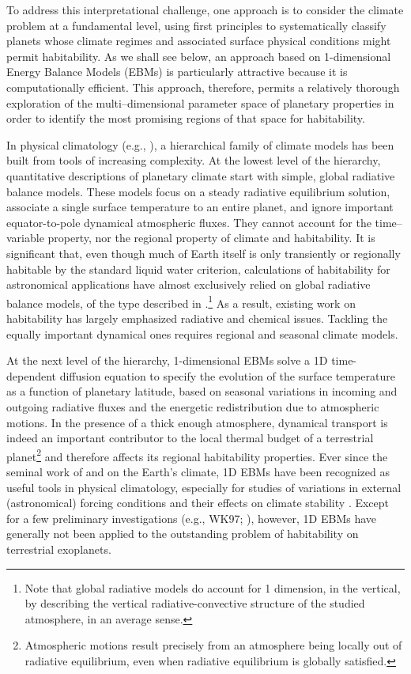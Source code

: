 To address this interpretational challenge, one approach is to
consider the climate problem at a fundamental level, using first
principles to systematically classify planets whose climate regimes
and associated surface physical conditions might permit
habitability. As we shall see below, an approach based on
1-dimensional Energy Balance Models (EBMs) is particularly attractive
because it is computationally efficient.  This approach, therefore,
permits a relatively thorough exploration of the multi--dimensional
parameter space of planetary properties in order to identify the most
promising regions of that space for habitability.

In physical climatology (e.g., \citealt{hartmann1994,ghil2002}), a
hierarchical family of climate models has been built from tools of
increasing complexity. At the lowest level of the hierarchy,
quantitative descriptions of planetary climate start with simple,
global radiative balance models.  These models focus on a steady
radiative equilibrium solution, associate a single surface temperature
to an entire planet, and ignore important equator-to-pole dynamical
atmospheric fluxes. They cannot account for the time--variable
property, nor the regional property of climate and habitability. It is
significant that, even though much of Earth itself is only transiently
or regionally habitable by the standard liquid water criterion,
calculations of habitability for astronomical applications have almost
exclusively relied on global radiative balance models, of the type
described in \citet{kasting_et_al1993}.\footnote{Note that global
radiative models do account for 1 dimension, in the vertical, by
describing the vertical radiative-convective structure of the studied
atmosphere, in an average sense.}  As a result, existing work on
habitability has largely emphasized radiative and chemical issues.
Tackling the equally important dynamical ones requires regional and
seasonal climate models.

At the next level of the hierarchy, 1-dimensional EBMs solve a 1D
time-dependent diffusion equation to specify the evolution of the
surface temperature as a function of planetary latitude, based on
seasonal variations in incoming and outgoing radiative fluxes and the
energetic redistribution due to atmospheric motions. In the presence
of a thick enough atmosphere, dynamical transport is indeed an
important contributor to the local thermal budget of a terrestrial
planet\footnote{Atmospheric motions result precisely from an
atmosphere being locally out of radiative equilibrium, even when
radiative equilibrium is globally satisfied.} and therefore affects
its regional habitability properties. Ever since the seminal work of
\citet{budyko1969} and \citet{sellers1969} on the Earth's climate, 1D
EBMs have been recognized as useful tools in physical climatology,
especially for studies of variations in external (astronomical)
forcing conditions and their effects on climate stability
\citep{hartmann1994}. Except for a few preliminary investigations
(e.g., WK97; \citet{franck_et_al2000b,gaidos+williams2004}), however,
1D EBMs have generally not been applied to the outstanding problem of
habitability on terrestrial exoplanets.

